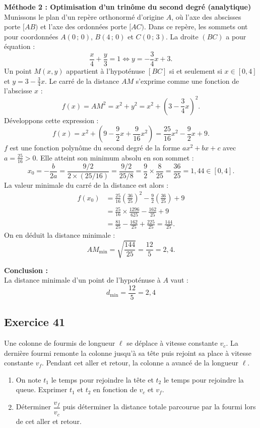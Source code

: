 \documentclass[11pt,a4paper]{article}
\begin{document}
\begin{correctionbox}
\textbf{Méthode 2 : Optimisation d'un trinôme du second degré (analytique)}\\
Munissons le plan d'un repère orthonormé d'origine $A$, où l'axe des abscisses porte $[AB)$ et l'axe des ordonnées porte $[AC)$.
Dans ce repère, les sommets ont pour coordonnées $A(0\,;\,0)$, $B(4\,;\,0)$ et $C(0\,;\,3)$.
La droite $(BC)$ a pour équation :
\[
\frac{x}{4} + \frac{y}{3} = 1 \iff y = -\frac{3}{4}x + 3.
\]
Un point $M(x, y)$ appartient à l'hypoténuse $[BC]$ si et seulement si $x \in [0, 4]$ et $y = 3 - \frac{3}{4}x$.
Le carré de la distance $AM$ s'exprime comme une fonction de l'abscisse $x$ :
\[
f(x) = AM^2 = x^2 + y^2 = x^2 + \left(3 - \frac{3}{4}x\right)^2.
\]
Développons cette expression :
\[
f(x) = x^2 + \left(9 - \frac{9}{2}x + \frac{9}{16}x^2\right) = \frac{25}{16}x^2 - \frac{9}{2}x + 9.
\]
$f$ est une fonction polynôme du second degré de la forme $ax^2 + bx + c$ avec $a = \frac{25}{16} > 0$.
Elle atteint son minimum absolu en son sommet :
\[
x_0 = -\frac{b}{2a} = \frac{9/2}{2 \times (25/16)} = \frac{9/2}{25/8} = \frac{9}{2} \times \frac{8}{25} = \frac{36}{25} = 1{,}44 \in [0, 4].
\]
La valeur minimale du carré de la distance est alors :
\[
\begin{aligned}
f(x_0) &= \frac{25}{16}\left(\frac{36}{25}\right)^2 - \frac{9}{2}\left(\frac{36}{25}\right) + 9 \\
&= \frac{25}{16} \times \frac{1296}{625} - \frac{162}{25} + 9 \\
&= \frac{81}{25} - \frac{162}{25} + \frac{225}{25} = \frac{144}{25}.
\end{aligned}
\]
On en déduit la distance minimale :
\[
AM_{\min} = \sqrt{\frac{144}{25}} = \frac{12}{5} = 2{,}4.
\]

\textbf{Conclusion :}\\
La distance minimale d'un point de l'hypoténuse à $A$ vaut :
\[
\boxed{d_{\min} = \frac{12}{5} = 2{,}4}
\]
\end{correctionbox}

\subsection*{Exercice 41}
Une colonne de fourmis de longueur $\ell$ se déplace à vitesse constante $v_c$. La dernière fourmi remonte la colonne jusqu'à sa tête puis rejoint sa place à vitesse constante $v_f$. Pendant cet aller et retour, la colonne a avancé de la longueur $\ell$.
\begin{enumerate}
    \item On note $t_1$ le temps pour rejoindre la tête et $t_2$ le temps pour rejoindre la queue. Exprimer $t_1$ et $t_2$ en fonction de $v_c$ et $v_f$.
    \item Déterminer $\dfrac{v_f}{v_c}$ puis déterminer la distance totale parcourue par la fourmi lors de cet aller et retour.
\end{enumerate}
\end{document}
